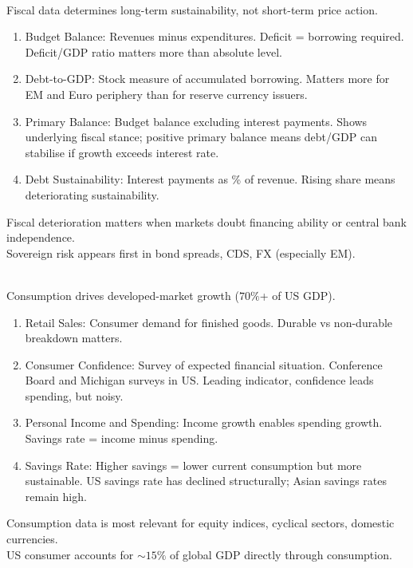 \documentclass[a4paper,oneside,openany]{book}
\begin{document}
\begin{remark} \\
Fiscal data determines long-term sustainability, not short-term price action.
\begin{enumerate}[label=\roman*.]
\setlength{\itemsep}{0pt}
\item Budget Balance: Revenues minus expenditures. Deficit = borrowing required. Deficit/GDP ratio matters more than absolute level.
\item Debt-to-GDP: Stock measure of accumulated borrowing. Matters more for EM and Euro periphery than for reserve currency issuers.
\item Primary Balance: Budget balance excluding interest payments. Shows underlying fiscal stance; positive primary balance means debt/GDP can stabilise if growth exceeds interest rate.
\item Debt Sustainability: Interest payments as \% of revenue. Rising share means deteriorating sustainability.
\end{enumerate}
Fiscal deterioration matters when markets doubt financing ability or central bank independence.\\
Sovereign risk appears first in bond spreads, CDS, FX (especially EM).
\end{remark}

\begin{remark} \\
Consumption drives developed-market growth ($70\%$+ of US GDP).
\begin{enumerate}[label=\roman*.]
\setlength{\itemsep}{0pt}
\item Retail Sales: Consumer demand for finished goods. Durable vs non-durable breakdown matters.
\item Consumer Confidence: Survey of expected financial situation. Conference Board and Michigan surveys in US. Leading indicator, confidence leads spending, but noisy.
\item Personal Income and Spending: Income growth enables spending growth. Savings rate = income minus spending.
\item Savings Rate: Higher savings = lower current consumption but more sustainable. US savings rate has declined structurally; Asian savings rates remain high.
\end{enumerate}
Consumption data is most relevant for equity indices, cyclical sectors, domestic currencies.\\
US consumer accounts for $\sim 15\%$ of global GDP directly through consumption.
\end{remark}
\end{document}
